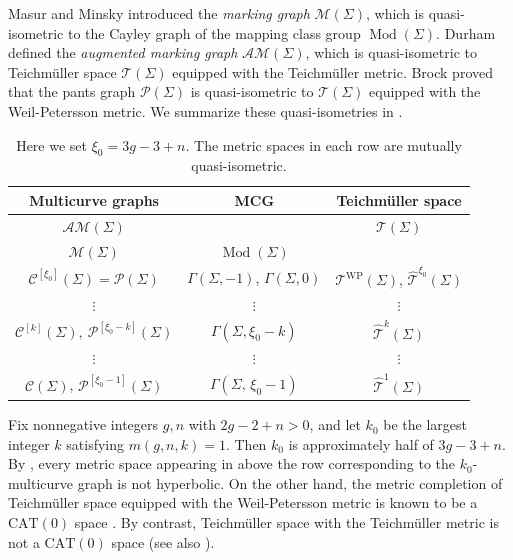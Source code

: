 \documentclass[a4paper,11pt]{amsart}
\numberwithin{equation}{section}
\theoremstyle{definition}
\newcommand{\Teich}{\mathcal{T}}
\newcommand{\elTeich}{\hat{\mathcal{T}}}
\DeclareMathOperator{\Mod}{Mod}
\newcommand{\multicurve}[1]{\mathcal{C}^{[#1]}}
\newcommand{\interpolate}[1]{\mathcal{P}^{[#1]}}
\begin{document}
Masur and Minsky \cite{masur2000complex} introduced the \emph{marking graph} $\mathcal{M}(\Sigma)$, which is quasi-isometric to the Cayley graph of the mapping class group $\Mod(\Sigma)$.
Durham \cite{durham2016augmented} defined the \emph{augmented marking graph} $\mathcal{AM}(\Sigma)$, which is quasi-isometric to Teichmüller space $\Teich(\Sigma)$ equipped with the Teichmüller metric.
Brock \cite{brock2003weil} proved that the pants graph $\mathcal{P}(\Sigma)$ is quasi-isometric to $\Teich(\Sigma)$ equipped with the Weil-Petersson metric.
We summarize these quasi-isometries in . 
\begin{table}[h]
    \begin{center}
        \begin{tabular}{c c c} 
            \textbf{Multicurve graphs} & \textbf{MCG} & \textbf{Teichmüller space} \\ \hline
            $\mathcal{AM}(\Sigma)$ & \  & $\Teich(\Sigma)$ \\
            $\mathcal{M}(\Sigma)$  & $\Mod(\Sigma)$ & \  \\
            $\multicurve{\xi_0}(\Sigma)=\mathcal{P}(\Sigma)$  & $\Gamma(\Sigma,-1)$, $\Gamma(\Sigma,0)$ & $\Teich^{\mathrm{WP}}(\Sigma)$, $\elTeich^{\xi_0}(\Sigma)$ \\
            $\vdots$ & $\vdots$ & $\vdots$ \\
            $\multicurve{k}(\Sigma),\  \interpolate{\xi_0-k}(\Sigma)$ & $\Gamma(\Sigma,\xi_0-k)$
            & $\elTeich^{k}(\Sigma)$ \\
            $\vdots$ & $\vdots$ & $\vdots$ \\
            $\mathcal{C}(\Sigma)$, $\interpolate{\xi_0-1}(\Sigma)$ & $\Gamma(\Sigma,\,\xi_0-1)$ & $\elTeich^{1}(\Sigma)$ \\
        \end{tabular}
        \vspace{2mm}
    \end{center}
\caption{Here we set $\xi_0=3g-3+n$. The metric spaces in each row are mutually quasi-isometric.}
\label{table:QIMetricSpaces}
\end{table}

Fix nonnegative integers $g,n$ with $2g-2+n>0$, and let $k_0$ be the largest integer $k$ satisfying $m(g,n,k)=1$.
Then $k_0$ is approximately half of $3g-3+n$.
By , every metric space appearing in  above the row corresponding to the $k_0$-multicurve graph is not hyperbolic.
On the other hand, the metric completion of Teichmüller space equipped with the Weil-Petersson metric is known to be a $\mathrm{CAT}(0)$ space \cite{yamada2004completion,wolpart2002completion}.
By contrast, Teichmüller space with the Teichmüller metric is not a $\mathrm{CAT}(0)$ space \cite{masur1975geodesic} (see also \cite{liu2020distance}).
\end{document}
